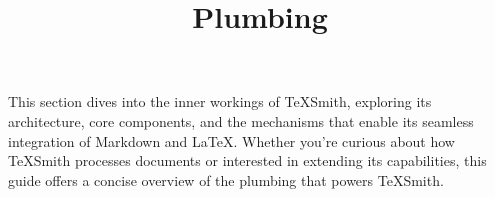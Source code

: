 \documentclass[a4paper,twoside]{article}
\title{Plumbing}
\author{}\date{}
\begin{document}
\maketitle
This section dives into the inner workings of TeXSmith, exploring its architecture, core components, and the mechanisms that enable its seamless integration of Markdown and \LaTeX{}. Whether you're curious about how TeXSmith processes documents or interested in extending its capabilities, this guide offers a concise overview of the plumbing that powers TeXSmith.
\end{document}
